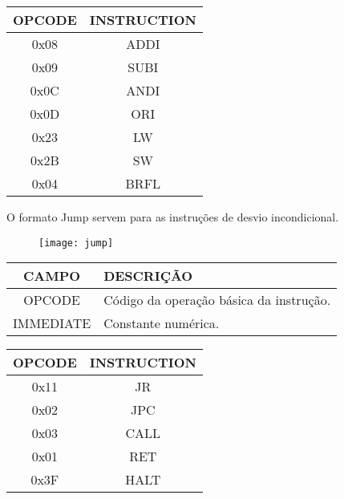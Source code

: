 \begin{table}[H]
\centering	
\begin{tabular}{|c|c|}
	\hline 
  	\cellcolor[gray]{0.9}\textbf{OPCODE} & \cellcolor[gray]{0.9}\textbf{INSTRUCTION} \\ 
	\hline 
	0x08 & ADDI \\ 
	\hline 
	0x09 & SUBI \\ 
	\hline 
	0x0C & ANDI \\ 
	\hline 
	0x0D & ORI \\ 
	\hline
	0x23 & LW \\ 
	\hline 
	0x2B & SW \\
	\hline
	0x04 & BRFL \\ 
  	\hline 
	\end{tabular} 
\end{table}	
	
 O formato Jump servem para as instruções de desvio incondicional.  	
   	\begin{figure}[H]
    	\centering
    	\texttt{[image: jump]}
		\label{jump}
  	\end{figure}
  	
\begin{table}[H]
\centering	
\begin{tabular}{|c|l|}
	\hline 
	\cellcolor[gray]{0.9}\textbf{CAMPO} & \cellcolor[gray]{0.9}\textbf{DESCRIÇÃO} \\ 
	\hline 
	OPCODE & Código da operação básica da instrução. \\ 
	\hline 
	IMMEDIATE & Constante numérica. \\ 
	\hline 
	\end{tabular} 
	\end{table}
 
\begin{table}[H]
\centering 	
  	\begin{tabular}{|c|c|}
  	\hline 
  	\cellcolor[gray]{0.9}\textbf{OPCODE} & \cellcolor[gray]{0.9}\textbf{INSTRUCTION} \\ 
  	\hline 
  	0x11 & JR \\ 
  	\hline 
  	0x02 & JPC \\ 
  	\hline 
  	0x03 & CALL \\ 
  	\hline 
  	0x01 & RET \\ 
  	\hline 
  	0x3F & HALT \\ 
  	\hline 
  	\end{tabular} 
\end{table}
